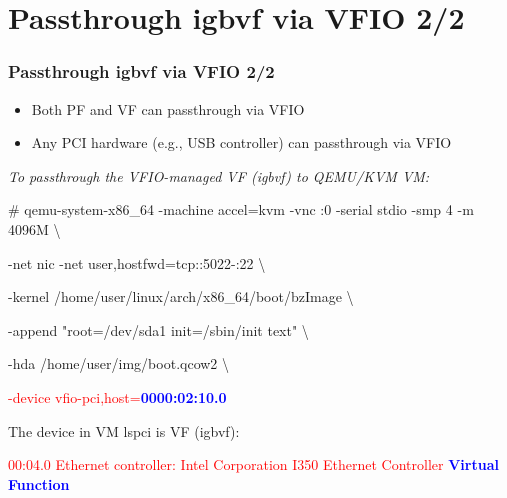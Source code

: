 \documentclass[aspectratio=169]{beamer}
\begin{document}

\section{Passthrough igbvf via VFIO 2/2}
\begin{frame}
\frametitle{Passthrough igbvf via VFIO 2/2}
\begin{itemize}
\item Both PF and VF can passthrough via VFIO
\item Any PCI hardware (e.g., USB controller) can passthrough via VFIO
\end{itemize}
\begin{block}{}
\textit{To passthrough the VFIO-managed VF (igbvf) to QEMU/KVM VM:}

\vspace{2 mm}

\# qemu-system-x86\_64 -machine accel=kvm -vnc :0 -serial stdio -smp 4 -m 4096M \textbackslash

-net nic -net user,hostfwd=tcp::5022-:22 \textbackslash

-kernel /home/user/linux/arch/x86\_64/boot/bzImage \textbackslash
	
-append "root=/dev/sda1 init=/sbin/init text" \textbackslash

-hda /home/user/img/boot.qcow2 \textbackslash

\textcolor{red}{-device vfio-pci,host=\textbf{\textcolor{blue}{0000:02:10.0}}}
\end{block}
\begin{block}{}
The device in VM lspci is VF (igbvf):

\textcolor{red}{00:04.0 Ethernet controller: Intel Corporation I350 Ethernet Controller \textbf{\textcolor{blue}{Virtual Function}}}
\end{block}
\end{frame}

\end{document}
